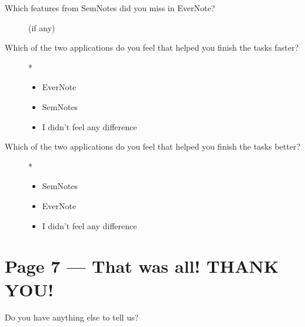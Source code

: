 \begin{description}
 \item[Which features from SemNotes did you miss in EverNote?] (if any)
\end{description}

\begin{description}
 \item[Which of the two applications do you feel that helped you finish the tasks faster?] *

\begin{itemize}[$\circ$]
\item EverNote
\item SemNotes
\item I didn't feel any difference
\end{itemize}
\end{description}

\begin{description}
 \item[Which of the two applications do you feel that helped you finish the tasks better?] *

\begin{itemize}[$\circ$]
\item SemNotes
\item EverNote
\item I didn't feel any difference
\end{itemize}
\end{description}

\section*{Page 7 --- That was all! THANK YOU!}

\begin{description}
 \item[Do you have anything else to tell us?] 
\end{description}
